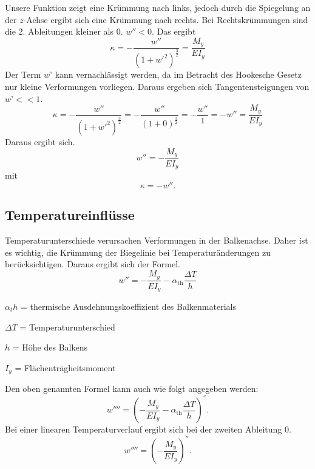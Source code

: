 Unsere Funktion zeigt eine Krümmung nach links, jedoch durch die Spiegelung an der $z$-Achse ergibt sich eine Krümmung nach rechts.
Bei Rechtskrümmungen sind die 2. Ableitungen kleiner als 0. $w'' < 0$.
Das ergibt
\begin{equation}
	\kappa=
	-\frac{w''}{\left(1+{w'}^2\right)^\frac{3}{2}}=
	\frac{M_y}{EI_y}
\end{equation}
Der Term $w’$ kann vernachlässigt werden, da im Betracht des Hookesche Gesetz nur kleine Verformungen vorliegen.
Daraus ergeben sich Tangentensteigungen von $w’ << 1$.
\begin{equation}
	\kappa=
	-\frac{w''}{\left(1+{w'}^2\right)^\frac{3}{2}}=
	-\frac{w''}{\left(1+0\right)^\frac{3}{2}}=
	-\frac{w''}{1}=-w''=
	\frac{M_y}{EI_y}
\end{equation}
Daraus ergibt sich.
\begin{equation}
	w''=
	-\frac{M_y}{EI_y}
\end{equation}
mit
\begin{equation}
	\kappa=
	-w''.
\end{equation}

\subsection{Temperatureinflüsse}
Temperaturunterschiede verursachen Verformungen in der Balkenachse.
Daher ist es wichtig, die Krümmung der Biegelinie bei Temperaturänderungen zu berücksichtigen.
Daraus ergibt sich der Formel.
\begin{equation}
	w''=
	-\frac{M_y}{EI_y}-\alpha_{\text{th}}\frac{\Delta T}{h}
\end{equation}

$α_th$ = thermische Ausdehnungskoeffizient des Balkenmaterials

$\Delta T$ = Temperaturunterschied

$h$ = Höhe des Balkens

$I_y$ = Flächenträgheitsmoment

Den oben genannten Formel kann auch wie folgt angegeben werden:
\begin{equation}
	w''''=
	\left(-\frac{M_y}{EI_y}-\alpha_{\text{th}}\frac{\Delta T}{h}\right)^{''}.
\end{equation}
Bei einer linearen Temperaturverlauf ergibt sich bei der zweiten Ableitung 0.
\begin{equation}
	w''''=
	\left(-\frac{M_y}{EI_y}\right)^{''}.
\end{equation}

